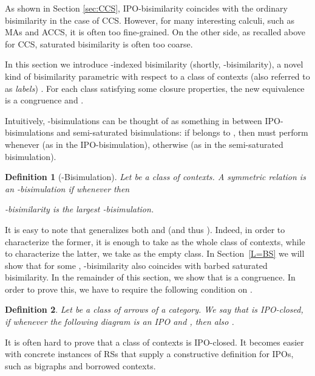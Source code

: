 \documentclass[copyright,creativecommons]{eptcs}
\newcommand{\<}{\langle}
\renewcommand{\>}{\rangle}
\newtheorem{definition}{Definition}{}
\begin{document}
As shown in Section \ref{sec:CCS}, IPO-bisimilarity coincides with the
ordinary bisimilarity in the case of CCS.  However, for many
interesting calculi, such as MAs and ACCS, it is often too
fine-grained. On the other side, as recalled above for CCS, saturated
bisimilarity is often too coarse.

In this section we introduce -indexed bisimilarity (shortly,
-bisimilarity), a novel kind of bisimilarity parametric with
respect to a class of contexts (also referred to as \emph{labels})
. For each class  satisfying some closure properties, the new
equivalence  is a congruence and .

Intuitively, -bisimulations can be thought of as something in between
IPO-bisimulations and semi-saturated bisimulations: if  belongs
to , then  must perform  whenever 
(as in the IPO-bisimulation), otherwise  (as in the
semi-saturated bisimulation).

\begin{definition}[-Bisimulation]\label{def:L1bis}
Let  be a class of contexts.
A symmetric relation  is an -\emph{bisimulation} if
whenever  then


-\emph{bisimilarity}  is the largest -bisimulation.
\end{definition}

It is easy to note that  generalizes both  and
 (and thus ). Indeed, in order to characterize
the former, it is enough to take as  the whole class of contexts,
while to characterize the latter, we take as  the empty class. In
Section~\ref{L=BS} we will show that for some ,
-bisimilarity also coincides with barbed saturated bisimilarity.
In the remainder of this section, we show that  is a
congruence. In order to prove this, we have to require the following
condition on .

\begin{definition} Let  be a class of arrows of a category. We say that  is
IPO-closed, if whenever the following diagram is an IPO and , then also .

\end{definition}

It is often hard to prove that a class of contexts is IPO-closed.
It becomes easier with concrete instances of RSs
that supply a constructive definition for IPOs, such as
bigraphs and borrowed contexts.
\end{document}
